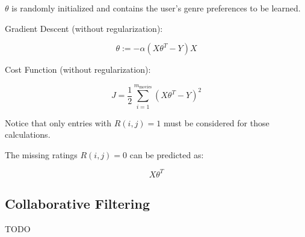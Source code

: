 \documentclass[a4paper,11pt]{scrartcl}
\begin{document}
$\theta$ is randomly initialized and contains the user's genre preferences to be learned.

Gradient Descent (without regularization):

$$ \theta := - \alpha (X \theta^T - Y) X $$

Cost Function (without regularization):

$$ J = \frac{1}{2} \sum_{i=1}^{m_{\text{movies}}} (X \theta^T - Y)^2 $$

Notice that only entries with $R(i,j)=1$ must be considered for those calculations.

The missing ratings $R(i,j)=0$ can be predicted as:

$$ X \theta^T $$

\subsection{Collaborative Filtering}

TODO
\end{document}
